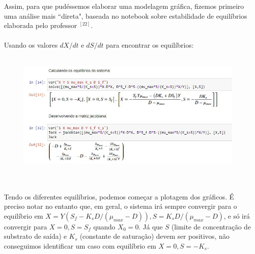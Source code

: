 \documentclass{article}
\begin{document}
\\\\Assim, para que pudéssemos elaborar uma modelagem gráfica, fizemos primeiro uma análise mais ``direta", baseada no notebook sobre estabilidade de equilíbrios elaborada pelo professor $^{[22]}$.
\\\\Usando os valores $dX/dt$ e $dS/dt$ para encontrar os equilíbrios:
\begin{figure}[H]
        \centering
        \hbox{\hspace{7.0em} \includegraphics[scale=0.5] {Equilibrios.jpg}} 
\end{figure}
\\\\Tendo os diferentes equilíbrios, podemos começar a plotagem dos gráficos. É preciso notar no entanto que, em geral, o sistema irá sempre convergir para o equilíbrio em $X = Y(S_f- K_sD/(\mu_{max}-D)), S = K_sD/(\mu_{max}-D)$, e só irá convergir para $X = 0, S=S_f$ quando $X_0=0$. Já que $S$ (limite de concentração de substrato de saída) e $K_s$ (constante de saturação) devem ser positivos, não conseguimos identificar um caso com equilíbrio em $X = 0, S=-K_s$.
\end{document}
